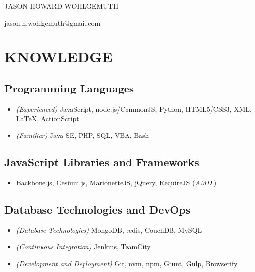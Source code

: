 \documentclass[10pt]{article}
\begin{document}
\begin{center}\Huge {JASON HOWARD WOHLGEMUTH}\end{center}
\begin{center}jason.h.wohlgemuth@gmail.com\end{center}

\section{KNOWLEDGE}\label{knowledge}

\subsection{Programming Languages}\label{programming-languages}

\begin{itemize}
\itemsep1pt\parskip0pt
\item
  \emph{(Experienced)} JavaScript, node.js/CommonJS, Python, HTML5/CSS3,
  XML, LaTeX, ActionScript
\item
  \emph{(Familiar)} Java SE, PHP, SQL, VBA, Bash
\end{itemize}

\subsection{JavaScript Libraries and
Frameworks}\label{javascript-libraries-and-frameworks}

\begin{itemize}
\itemsep1pt\parskip0pt
\item
  Backbone.js, Cesium.js, MarionetteJS, jQuery, RequireJS (\emph{AMD })
\end{itemize}

\subsection{Database Technologies and
DevOps}\label{database-technologies-and-devops}

\begin{itemize}
\itemsep1pt\parskip0pt
\item
  \emph{(Database Technologies)} MongoDB, redis, CouchDB, MySQL
\item
  \emph{(Continuous Integration)} Jenkins, TeamCity
\item
  \emph{(Development and Deployment)} Git, nvm, npm, Grunt, Gulp,
  Browserify
\end{itemize}
\end{document}
